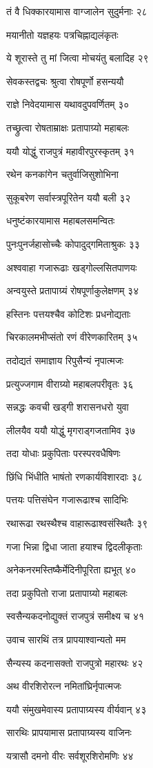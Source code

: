 तं वै धिक्कारयामास वाग्जालेन सुदुर्मनाः २८

मयानीतो यज्ञहयः पत्रचिह्नाद्यलंकृतः

ये शूरास्ते तु मां जित्वा मोचयंतु बलादिह २९

सेवकस्तद्वचः श्रुत्वा रोषपूर्णो हसन्ययौ

राज्ञे निवेदयामास यथावदुपवर्णितम् ३०

तच्छ्रुत्वा रोषताम्राक्षः प्रतापाग्र्यो महाबलः

ययौ योद्धुं राजपुत्रं महावीरपुरस्कृतम् ३१

रथेन कनकांगेन चतुर्वाजिसुशोभिना

सुकूबरेण सर्वास्त्रपूरितेन ययौ बली ३२

धनुष्टंकारयामास महाबलसमन्वितः

पुनःपुनर्जहासोच्चैः कोपादुद्गमिताश्रुकः ३३

अश्ववाहा गजारूढाः खड्गोल्लसितपाणयः

अन्वयुस्ते प्रतापाग्र्यं रोषपूर्णाकुलेक्षणम् ३४

हस्तिनः पत्तयश्चैव कोटिशः प्रधनोद्यताः

चिरकालमभीप्संतो रणं वीरेणकारितम् ३५

तदोद्यतं समाज्ञाय रिपुसैन्यं नृपात्मजः

प्रत्युज्जगाम वीराग्र्यो महाबलपरीवृतः ३६

सन्नद्धः कवची खड्गी शरासनधरो युवा

लीलयैव ययौ योद्धुं मृगराड्गजतामिव ३७

तदा योधाः प्रकुपिताः परस्परवधैषिणः

छिंधि भिंधीति भाषंतो रणकार्यविशारदाः ३८

पत्तयः पत्तिसंघेन गजारूढाश्च सादिभिः

रथारूढा रथस्थैश्च वाहारूढाश्वसंस्थितैः ३९

गजा भिन्ना द्विधा जाता हयाश्च द्विदलीकृताः

अनेकनरमस्तिष्कैर्मेदिनीपूरिता ह्यभूत् ४०

तदा प्रकुपितो राजा प्रतापाग्र्यो महाबलः

स्वसैन्यकदनोद्युक्तं राजपुत्रं समीक्ष्य च ४१

उवाच सारथिं तत्र प्रापयाश्वान्यतो मम

सैन्यस्य कदनासक्तो राजपुत्रो महारथः ४२

अथ वीरशिरोरत्न नमितांघ्रिर्नृपात्मजः

ययौ संमुखमेवास्य प्रतापाग्र्यस्य वीर्यवान् ४३

सारथिः प्रापयामास प्रतापाग्र्यस्य वाजिनः

यत्रासौ दमनो वीरः सर्वशूरशिरोमणिः ४४

